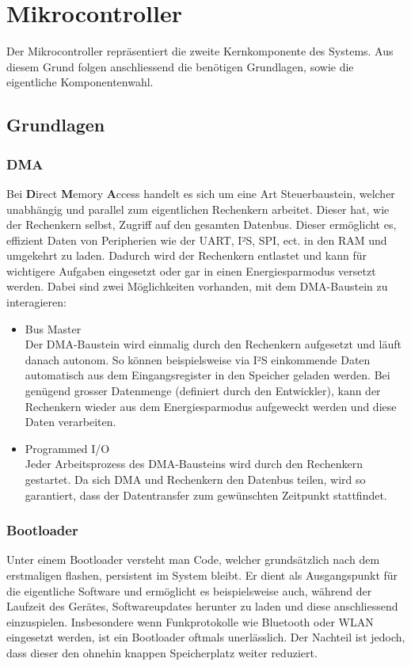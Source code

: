 \documentclass[12pt]{article}
\begin{document}
	\section{Mikrocontroller}\label{Mikrocontroller}
	Der Mikrocontroller repräsentiert die zweite Kernkomponente des Systems. Aus diesem Grund folgen anschliessend die benötigen Grundlagen, sowie die eigentliche Komponentenwahl.
	\subsection{Grundlagen}
	\subsubsection*{DMA}
	Bei \textbf{D}irect \textbf{M}emory \textbf{A}ccess handelt es sich um eine Art Steuerbaustein, welcher unabhängig und parallel zum eigentlichen Rechenkern arbeitet. Dieser hat, wie der Rechenkern selbst, Zugriff auf den gesamten Datenbus. Dieser ermöglicht es, effizient Daten von Peripherien wie der UART, I²S, SPI, ect. in den RAM und umgekehrt zu laden. Dadurch wird der Rechenkern entlastet und kann für wichtigere Aufgaben eingesetzt oder gar in einen Energiesparmodus versetzt werden. Dabei sind zwei Möglichkeiten vorhanden, mit dem DMA-Baustein zu interagieren:
	\begin{itemize}
		\item Bus Master \\
		Der DMA-Baustein wird einmalig durch den Rechenkern aufgesetzt und läuft danach autonom. So können beispielsweise via I²S einkommende Daten automatisch aus dem Eingangsregister in den Speicher geladen werden. Bei genügend grosser Datenmenge (definiert durch den Entwickler), kann der Rechenkern wieder aus dem Energiesparmodus aufgeweckt werden und diese Daten verarbeiten.
		\item Programmed I/O \\
		Jeder Arbeitsprozess des DMA-Bausteins wird durch den Rechenkern gestartet. Da sich DMA und Rechenkern den Datenbus teilen, wird so garantiert, dass der Datentransfer zum gewünschten Zeitpunkt stattfindet.
	\end{itemize}
	\subsubsection*{Bootloader}
	Unter einem Bootloader versteht man Code, welcher grundsätzlich nach dem erstmaligen flashen, persistent im System bleibt. Er dient als Ausgangspunkt für die eigentliche Software und ermöglicht es beispielsweise auch, während der Laufzeit des Gerätes, Softwareupdates herunter zu laden und diese anschliessend einzuspielen. Insbesondere wenn Funkprotokolle wie Bluetooth oder WLAN eingesetzt werden, ist ein Bootloader oftmals unerlässlich. Der Nachteil ist jedoch, dass dieser den ohnehin knappen Speicherplatz weiter reduziert.
\end{document}
